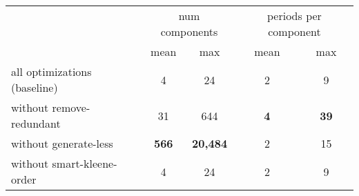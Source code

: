 \begin{table}[H]
	\centering
	\begin{tabular}{l c c c c}
		\toprule
		& \multicolumn{2}{c}{num components} & \multicolumn{2}{c}{periods per component} \\
		\cmidrule(lr){2-3} \cmidrule(lr){4-5}
		& mean & max & mean & max \\
		\midrule
	all optimizations (baseline) & 4 & 24 & 2 & 9 \\
	without remove-redundant & 31 & 644 & \textbf{4} & \textbf{39} \\
	without generate-less & \textbf{566} & \textbf{20{,}484} & 2 & 15 \\
	without smart-kleene-order & 4 & 24 & 2 & 9 \\
  \bottomrule
	\end{tabular}
\end{table}
